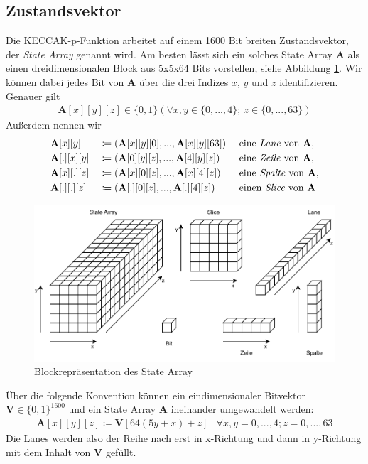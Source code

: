\subsection{Zustandsvektor}
Die KECCAK-p-Funktion arbeitet auf einem 1600 Bit breiten Zustandsvektor, der \textit{State Array} genannt wird.
Am besten lässt sich ein solches State Array \textbf{A} als einen dreidimensionalen Block aus 5x5x64 Bits vorstellen, siehe Abbildung \ref{fig:statearray}.
Wir können dabei jedes Bit von \textbf{A} über die drei Indizes $x$, $y$ und $z$ identifizieren.
Genauer gilt
\begin{align*}
    \textbf{A}[x][y][z] \in \{0,1\} (\forall x, y \in \{0,...,4\};\ z \in \{0,...,63\})
\end{align*}
Außerdem nennen wir
\begin{align*}
    & \textbf{A}[x][y] && \coloneq (\textbf{A}[x][y][0], ... , \textbf{A}[x][y][63]) && \text{ eine \textit{Lane} von \textbf{A},} \\
    & \textbf{A}[.][x][y] && \coloneq (\textbf{A}[0][y][z], ... , \textbf{A}[4][y][z]) && \text{ eine \textit{Zeile} von \textbf{A},} \\
    & \textbf{A}[x][.][z] && \coloneq (\textbf{A}[x][0][z], ... , \textbf{A}[x][4][z]) && \text{ eine \textit{Spalte} von \textbf{A},} \\
    & \textbf{A}[.][.][z] && \coloneq (\textbf{A}[.][0][z], ... , \textbf{A}[.][4][z]) && \text{ einen \textit{Slice} von \textbf{A}}
\end{align*}
\begin{figure}
	\center
	\includegraphics{images/StateArrayBeschreibung.pdf}
	\caption{Blockrepräsentation des State Array}
	\label{fig:statearray}
\end{figure}
Über die folgende Konvention können ein eindimensionaler Bitvektor $\textbf{V} \in \{0,1\}^{1600}$ und ein State Array \textbf{A} ineinander umgewandelt werden:
\begin{align*}
	\textbf{A}[x][y][z] \coloneq \textbf{V}[64(5y + x) + z] & \forall x,y = 0,...,4; z = 0,...,63
\end{align*}
Die Lanes werden also der Reihe nach erst in x-Richtung und dann in y-Richtung mit dem Inhalt von \textbf{V} gefüllt.

